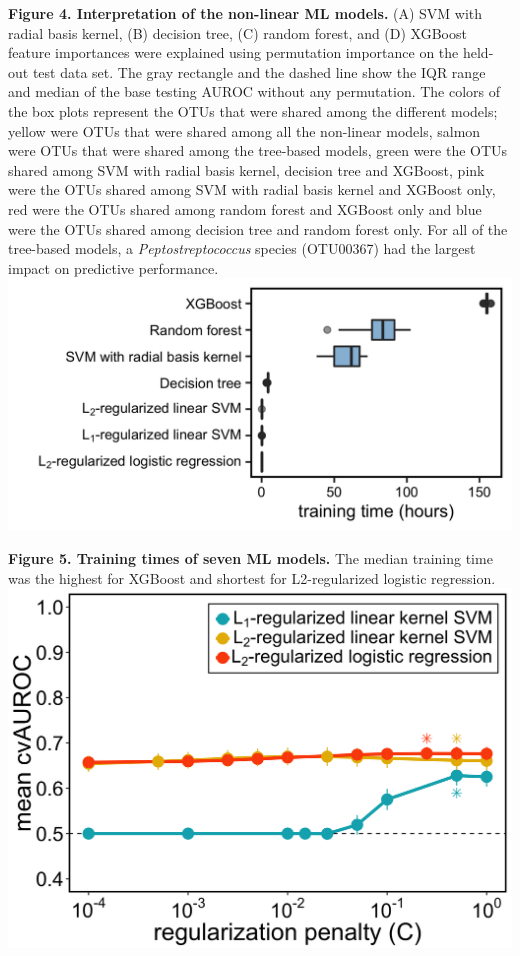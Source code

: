 \documentclass[11pt,]{article}
\begin{document}
\textbf{Figure 4. Interpretation of the non-linear ML models.} (A) SVM
with radial basis kernel, (B) decision tree, (C) random forest, and (D)
XGBoost feature importances were explained using permutation importance
on the held-out test data set. The gray rectangle and the dashed line
show the IQR range and median of the base testing AUROC without any
permutation. The colors of the box plots represent the OTUs that were
shared among the different models; yellow were OTUs that were shared
among all the non-linear models, salmon were OTUs that were shared among
the tree-based models, green were the OTUs shared among SVM with radial
basis kernel, decision tree and XGBoost, pink were the OTUs shared among
SVM with radial basis kernel and XGBoost only, red were the OTUs shared
among random forest and XGBoost only and blue were the OTUs shared among
decision tree and random forest only. For all of the tree-based models,
a \emph{Peptostreptococcus} species (OTU00367) had the largest impact on
predictive performance. \newpage
\includegraphics{Figure_5.png}

\textbf{Figure 5. Training times of seven ML models.} The median
training time was the highest for XGBoost and shortest for
L2-regularized logistic regression. \newpage
\includegraphics{Figure_S1.png}
\end{document}

